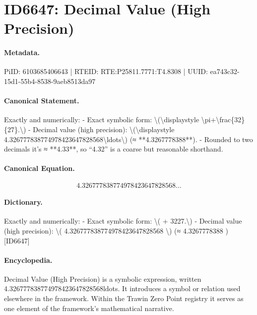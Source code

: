 \section*{ID6647: Decimal Value (High Precision)}
\paragraph{Metadata.}
PiID: 6103685406643 | RTEID: RTE:P25811.7771:T4.8308 | UUID: ea743c32-15d1-55b4-8538-9aeb8513da97

\paragraph{Canonical Statement.}
Exactly and numerically: - Exact symbolic form: \textbackslash{}(\textbackslash{}displaystyle \textbackslash{}pi+\textbackslash{}frac\{32\}\{27\}.\textbackslash{}) - Decimal value (high precision): \textbackslash{}(\textbackslash{}displaystyle 4.326777838774978423647828568\textbackslash{}ldots\textbackslash{}) (≈ **4.3267778388**). - Rounded to two decimals it’s ≈ **4.33**, so “4.32” is a coarse but reasonable shorthand.

\paragraph{Canonical Equation.}
\[
\displaystyle 4.326777838774978423647828568\ldots
\]

\paragraph{Dictionary.}
Exactly and numerically: - Exact symbolic form: \textbackslash{}( + 3227.\textbackslash{}) - Decimal value (high precision): \textbackslash{}( 4.326777838774978423647828568 \textbackslash{}) (≈ 4.3267778388 ) [ID6647]

\paragraph{Encyclopedia.}
Decimal Value (High Precision) is a symbolic expression, written 4.326777838774978423647828568ldots. It introduces a symbol or relation used elsewhere in the framework. Within the Trawin Zero Point registry it serves as one element of the framework's mathematical narrative.
